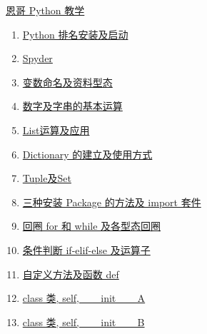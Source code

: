 \documentclass[11pt]{article}
\begin{document}
	\kaishu 
	\setcounter{section}{0}
	\begin{center}
		{\LARGE  \href{https://www.youtube.com/watch?v=QjALT8yrA2M&list=PLxRfOo_Hj4i_x3ZBfU8ePRc5-g7WQhoNc}{恩哥 Python 教学}}
		
		
	\end{center}
\setcounter{page}{1}



\begin{multicols}{2}
	\begin{enumerate}
		\item \href{https://mp.weixin.qq.com/s/gOqgLar5Ci6IYlBUiB7FGA}{Python 排名安装及启动}	%
		\item \href{https://mp.weixin.qq.com/s/zospQEYmEEp-i97C28CjiA}{Spyder}	%
		\item \href{https://mp.weixin.qq.com/s/dxBTLNLIJAP8k3NIneJKjg}{变数命名及资料型态}	%
		\item \href{https://mp.weixin.qq.com/s/S0MRDK0ahe1fWmxg6RimSg}{数字及字串的基本运算}	%
		\item \href{https://mp.weixin.qq.com/s/uZYU9EQAsoeDVmmyDhohgA}{List运算及应用}	%
		\item \href{https://mp.weixin.qq.com/s/UDk4lM4Qc1XJBS1bV-BIRQ}{Dictionary 的建立及使用方式}	%
		\item \href{https://mp.weixin.qq.com/s/17G9FkXNcNfGoD-9x12ikg}{Tuple及Set}	%
		\item \href{https://mp.weixin.qq.com/s/WuuyRWOrEMkSkxT3nRXIiA}{三种安装 Package 的方法及 import 套件}	%
		\item \href{https://mp.weixin.qq.com/s/PHDxnT031NQmcYhIxAubCQ}{回圈 for 和 while 及各型态回圈}	%
		\item \href{https://mp.weixin.qq.com/s/TiztrPEgu6DLJ2qLioPFig}{条件判断 if-elif-else 及运算子}	%
		\item \href{https://mp.weixin.qq.com/s/Hlm5-6ya9VPemB2tvdLR2w}{自定义方法及函数 def}	%
		\item \href{https://mp.weixin.qq.com/s/lgpLK4wGdpGq9JaP-zbq9g}{class 类, self, \_ \_init\_ \_  A}	%
		\item \href{https://mp.weixin.qq.com/s/RikLWZos2oQ2MkkMS-K5Lg}{class 类, self, \_ \_init\_ \_  B}	%
	\end{enumerate}
\end{multicols}
\end{document}
